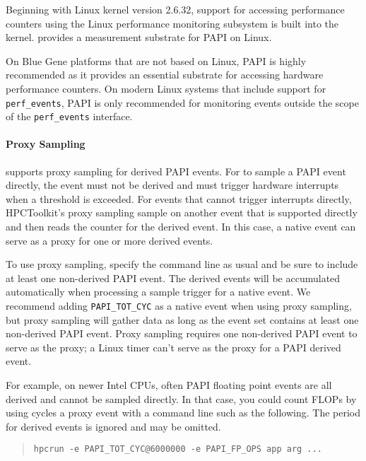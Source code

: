 Beginning with Linux kernel version 2.6.32,
support for accessing  performance counters 
using the Linux \perfevents{} performance monitoring subsystem is
built into the kernel.  \perfevents{}  provides a measurement substrate for PAPI on Linux.

On Blue Gene platforms that are not based on Linux,
PAPI is highly recommended as it provides an essential substrate for accessing
hardware performance counters. On modern Linux systems that include support
for \verb|perf_events|, PAPI is only recommended for monitoring 
events outside the scope of the \verb|perf_events| interface. 

\paragraph{Proxy Sampling}

\HPCToolkit{} supports proxy sampling for derived PAPI events.
For \HPCToolkit{} to sample a PAPI event directly, the event must not be
derived and must trigger hardware interrupts when a threshold is exceeded.  
For events that cannot trigger interrupts directly, HPCToolkit's proxy sampling
sample on another event that is supported directly and then reads the 
counter for the derived event. In this case, 
a native event can serve as a proxy for one or more derived events.

To use proxy sampling, specify the \hpcrun{} command line as usual and
be sure to include at least one non-derived PAPI event.  The derived
events will be accumulated automatically when processing a sample trigger for a native event.
We recommend adding \verb|PAPI_TOT_CYC| as a native event when using proxy sampling, but
proxy sampling will gather data  as long as the event set contains at least one
non-derived PAPI event.  Proxy sampling requires one non-derived PAPI event to serve as the proxy;
a Linux timer can't serve as the proxy for a PAPI derived event.

For example, on newer Intel CPUs, often PAPI floating point events are
all derived and cannot be sampled directly.  In that case, you could
count FLOPs by using cycles a proxy event with a command line such as
the following.  The period for derived events is ignored and may be
omitted.

\begin{quote}
\begin{verbatim}
hpcrun -e PAPI_TOT_CYC@6000000 -e PAPI_FP_OPS app arg ...
\end{verbatim}
\end{quote}

